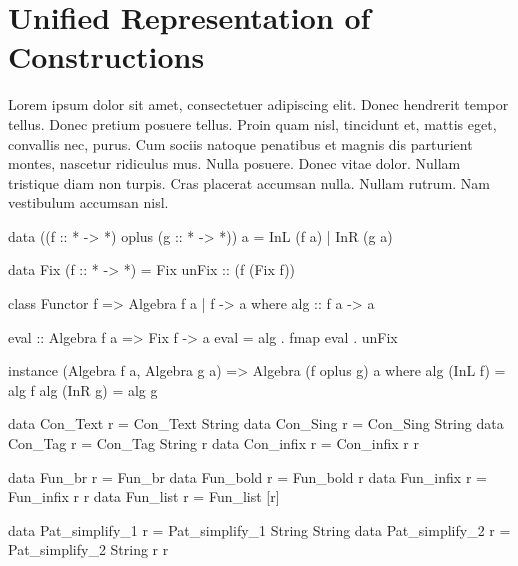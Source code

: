 \section{Unified Representation of Constructions}
\label{sec:representation}

Lorem ipsum dolor sit amet, consectetuer adipiscing elit. Donec hendrerit tempor
tellus. Donec pretium posuere tellus. Proin quam nisl, tincidunt et, mattis
eget, convallis nec, purus. Cum sociis natoque penatibus et magnis dis
parturient montes, nascetur ridiculus mus. Nulla posuere. Donec vitae dolor.
Nullam tristique diam non turpis. Cras placerat accumsan nulla. Nullam rutrum.
Nam vestibulum accumsan nisl.

\begin{code}
data ((f :: * -> *) oplus (g :: * -> *)) a = InL (f a) | InR (g a)
\end{code}

\begin{code}
  data Fix (f :: * -> *) = Fix { unFix :: (f (Fix f)) }
\end{code}

\begin{code}
class Functor f => Algebra f a | f -> a where
  alg :: f a -> a
\end{code}


\begin{code}
eval :: Algebra f a => Fix f -> a
eval = alg . fmap eval . unFix
\end{code}


\begin{code}
instance (Algebra f a, Algebra g a) => Algebra (f oplus g) a
  where  alg (InL f) = alg f
         alg (InR g) = alg g
\end{code}


\begin{code}
data Con_Text   r = Con_Text String
data Con_Sing   r = Con_Sing String
data Con_Tag    r = Con_Tag  String r
data Con_infix  r = Con_infix r r
\end{code}

\begin{code}
data Fun_br     r = Fun_br
data Fun_bold   r = Fun_bold r
data Fun_infix  r = Fun_infix r r
data Fun_list   r = Fun_list [r]
\end{code}

\begin{code}
data Pat_simplify_1 r = Pat_simplify_1 String String
data Pat_simplify_2 r = Pat_simplify_2 String r r
\end{code}

